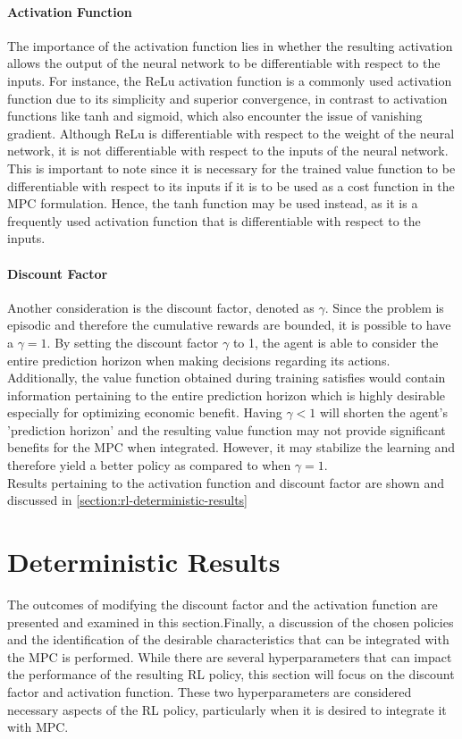 \paragraph{Activation Function} The importance of the activation function lies in whether the resulting activation allows the output of the neural network to be differentiable with respect to the inputs. For instance, the ReLu activation function is a commonly used activation function due to its simplicity and superior convergence, in contrast to activation functions like tanh and sigmoid, which also encounter the issue of vanishing gradient. Although ReLu is differentiable with respect to the weight of the neural network, it is not differentiable with respect to the inputs of the neural network. This is important to note since it is necessary for the trained value function to be differentiable with respect to its inputs if it is to be used as a cost function in the MPC formulation. Hence, the tanh function may be used instead, as it is a frequently used activation function that is differentiable with respect to the inputs.

\paragraph{Discount Factor} Another consideration is the discount factor, denoted as $\gamma$. Since the problem is episodic and therefore the cumulative rewards are bounded, it is possible to have a $\gamma = 1$. By setting the discount factor $\gamma$ to 1, the agent is able to consider the entire prediction horizon when making decisions regarding its actions. Additionally, the value function obtained during training satisfies would contain information pertaining to the entire prediction horizon which is highly desirable especially for optimizing economic benefit. Having $\gamma < 1$ will shorten the agent's 'prediction horizon' and the resulting value function may not provide significant benefits for the MPC when integrated. However, it may stabilize the learning and therefore yield a better policy as compared to when $\gamma = 1$. \\
Results pertaining to the activation function and discount factor are shown and discussed in \autoref{section:rl-deterministic-results}

\section{Deterministic Results}
The outcomes of modifying the discount factor and the activation function  are presented and examined in this section.Finally, a discussion of the chosen policies and the identification of the desirable characteristics that can be integrated with the MPC is performed. While there are several hyperparameters that can impact the performance of the resulting RL policy, this section will focus on the discount factor and activation function. These two hyperparameters are considered necessary aspects of the RL policy, particularly when it is desired to integrate it with MPC. 

